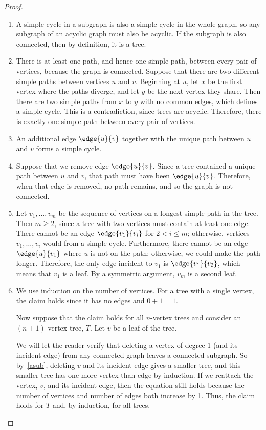 \begin{proof}

\begin{enumerate}
\item\label{asub} A simple cycle in a subgraph is also a simple cycle in
the whole graph, so any subgraph of an acyclic graph must also be acyclic.
If the subgraph is also connected, then by definition, it is a tree.

\item There is at least one path, and hence one simple path, between every
pair of vertices, because the graph is connected.  Suppose that there are
two different simple paths between vertices $u$ and $v$.  Beginning at
$u$, let $x$ be the first vertex where the paths diverge, and let $y$ be
the next vertex they share.  Then there are two simple paths from $x$ to
$y$ with no common edges, which defines a simple cycle.  This is a
contradiction, since trees are acyclic.  Therefore, there is exactly one
simple path between every pair of vertices.


\item An additional edge $\edge{u}{v}$ together with the unique path
between $u$ and $v$ forms a simple cycle.

\item Suppose that we remove edge $\edge{u}{v}$.  Since a tree
contained a unique path between $u$ and $v$, that path must have been
$\edge{u}{v}$.  Therefore, when that edge is removed, no path remains,
and so the graph is not connected.

\item Let $v_1, \dots, v_m$ be the sequence of vertices on a longest
simple path in the tree.  Then $m \geq 2$, since a tree with two vertices
must contain at least one edge.  There cannot be an edge $\edge{v_1}{v_i}$
for $2 < i \leq m$; otherwise, vertices $v_1, \dots, v_i$ would from a
simple cycle.  Furthermore, there cannot be an edge $\edge{u}{v_1}$ where
$u$ is not on the path; otherwise, we could make the path longer.
Therefore, the only edge incident to $v_1$ is $\edge{v_1}{v_2}$, which
means that $v_1$ is a leaf.  By a symmetric argument, $v_m$ is a second
leaf.

\item We use induction on the number of vertices.  For a tree with a
single vertex, the claim holds since it has no edges and $0 + 1 = 1$.

Now suppose that the claim holds for all $n$-vertex trees and consider an
$(n+1)$-vertex tree, $T$.  Let $v$ be a leaf of the tree.

We will let the reader verify that deleting a vertex of degree 1 (and its
incident edge) from any connected graph leaves a connected subgraph.  So
by~\eqref{asub}, deleting $v$ and its incident edge gives a smaller tree,
and this smaller tree has one more vertex than edge by induction.  If we
reattach the vertex, $v$, and its incident edge, then the equation still
holds because the number of vertices and number of edges both increase by
1.  Thus, the claim holds for $T$ and, by induction, for all trees.
\end{enumerate}
\end{proof}

